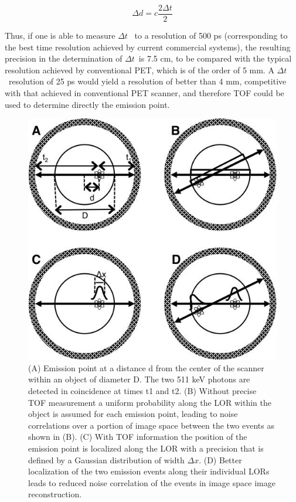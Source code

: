 \begin{equation}
\Delta d =c \frac{2 \Delta t}{2}
\end{equation}

Thus, if one is able to measure $\Delta t$~ to a resolution of 500 ps (corresponding to the
best time resolution achieved by current commercial systems), the resulting precision in the
determination of $\Delta t$~is 7.5 cm, to be compared with the typical resolution achieved by
conventional PET, which is of the order of 5 mm. A $\Delta t$~resolution of 25 ps would yield a resolution of better than 4 mm, competitive with that achieved in conventional PET scanner, and therefore TOF could be used to determine directly the emission point. 

\begin{figure}[!bhtp]
	\centering
	\includegraphics[scale=0.6]{img/tileshop.jpg}
	\caption{\label{fig.tile} (A) Emission point at a distance d from the center of the scanner within an object of diameter D. The two 511 keV photons are detected in coincidence at times t1 and t2. (B) Without precise TOF measurement a uniform probability along the LOR within the object is assumed for each emission point, leading to noise correlations over a portion of image space between the two events as shown in (B). (C) With TOF information the position of the emission point is localized along the LOR with a precision that is defined by a Gaussian distribution of width $\Delta x$. (D) Better localization of the two emission events along their individual LORs leads to reduced noise correlation of the events in image space image reconstruction. }
\end{figure}

